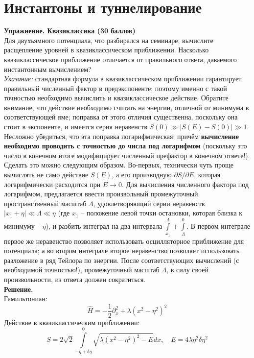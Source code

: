 \documentclass[12pt]{article}
\theoremstyle{definition}
\begin{document}
\section{Инстантоны и туннелирование}
\textbf{Упражнение. Квазиклассика (30 баллов)}\\
Для двухъямного потенциала, что разбирался на семинаре, вычислите расщепление уровней в квазиклассическом приближении. Насколько квазиклассическое приближение отличается от правильного ответа, даваемого инстантонным вычислением?\\
\textit{Указание:} стандартная формула в квазиклассическом приближении гарантирует правильный численный фактор в предэкспоненте; поэтому именно с такой точностью необходимо вычислить и квазиклассическое действие. Обратите внимание, что действие необходимо считать на энергии, отличной от минимума в соответствующей яме; поправка от этого отличия существенна, поскольку она стоит в экспоненте, и имеется серия неравенств $S(0) \gg |S(E)-S(0)| \gg 1$. Несложно убедиться, что эта поправка логарифмическая; причём \textbf{вычисление необходимо проводить с точностью до числа под логарифмом} (поскольку это число в конечном итоге модифицирует численный префактор в конечном ответе!).\\
Сделать это можно следующим образом. Во-первых, технически чуть проще вычислять не само действие $S(E)$, а его производную $\partial S/\partial E$, которая логарифмически расходится при $E\rightarrow0$. Для вычисления численного фактора под логарифмом, предлагается ввести произвольный промежуточный пространственный масштаб $\Lambda$, удовлетворяющий серии неравенств $|x_1 + \eta|\ll\Lambda\ll\eta$ (где $x_1$ -- положение левой точки остановки, которая близка к минимуму $-\eta$), и разбить интеграл на два интервала $\int\limits_{x_1}^\Lambda+\int\limits_\Lambda^0$. В первом интеграле первое же неравенство позволяет использовать осцилляторное приближение для потенциала; а во втором интеграле второе неравенство позволяет использовать разложение в ряд Тейлора по энергии. После соответствующих вычислений (с необходимой точностью!), промежуточный масштаб $\Lambda$, в силу своей произвольности, из ответа должен сократиться.\\
\textbf{Решение.}\\
Гамильтониан:
\begin{equation}
    \hat{H}=-\frac{1}{2}\partial_x^2+\lambda(x^2-\eta^2)^2
\end{equation}
Действие в квазиклассическим приближении:
\begin{equation}
    S=2\sqrt{2}\int\limits_{-\eta+\delta\eta}^0\sqrt{\lambda(x^2-\eta^2)^2-E}dx,\quad E=4\lambda\eta^2\delta\eta^2
\end{equation}
\end{document}
